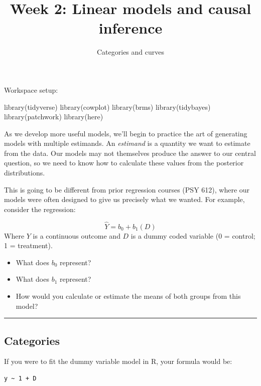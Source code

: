 \documentclass[
  letterpaper,
  DIV=11,
  numbers=noendperiod]{scrartcl}
\title{Week 2: Linear models and causal inference}
\subtitle{Categories and curves}
\author{}
\date{}
\newenvironment{Shaded}{\begin{snugshade}}{\end{snugshade}}
\newcommand{\FunctionTok}[1]{\textcolor[rgb]{0.28,0.35,0.67}{#1}}
\newcommand{\NormalTok}[1]{\textcolor[rgb]{0.00,0.23,0.31}{#1}}
\providecommand{\tightlist}{%
  \setlength{\itemsep}{0pt}\setlength{\parskip}{0pt}}\usepackage{longtable,booktabs,array}
\begin{document}
\maketitle


Workspace setup:

\begin{Shaded}
\begin{Highlighting}[]
\FunctionTok{library}\NormalTok{(tidyverse)}
\FunctionTok{library}\NormalTok{(cowplot)}
\FunctionTok{library}\NormalTok{(brms)}
\FunctionTok{library}\NormalTok{(tidybayes)}
\FunctionTok{library}\NormalTok{(patchwork)}
\FunctionTok{library}\NormalTok{(here)}
\end{Highlighting}
\end{Shaded}

As we develop more useful models, we'll begin to practice the art of
generating models with multiple estimands. An \emph{estimand} is a
quantity we want to estimate from the data. Our models may not
themselves produce the answer to our central question, so we need to
know how to calculate these values from the posterior distributions.

This is going to be different from prior regression courses (PSY 612),
where our models were often designed to give us precisely what we
wanted. For example, consider the regression:

\[
\hat{Y} = b_0 + b_1(D)
\] Where \(Y\) is a continuous outcome and \(D\) is a dummy coded
variable (0 = control; 1 = treatment).

\begin{itemize}
\tightlist
\item
  What does \(b_0\) represent?
\item
  What does \(b_1\) represent?
\item
  How would you calculate or estimate the means of both groups from this
  model?
\end{itemize}

\begin{center}\rule{0.5\linewidth}{0.5pt}\end{center}

\subsection{Categories}\label{categories}

If you were to fit the dummy variable model in R, your formula would be:

\begin{verbatim}
y ~ 1 + D
\end{verbatim}
\end{document}
